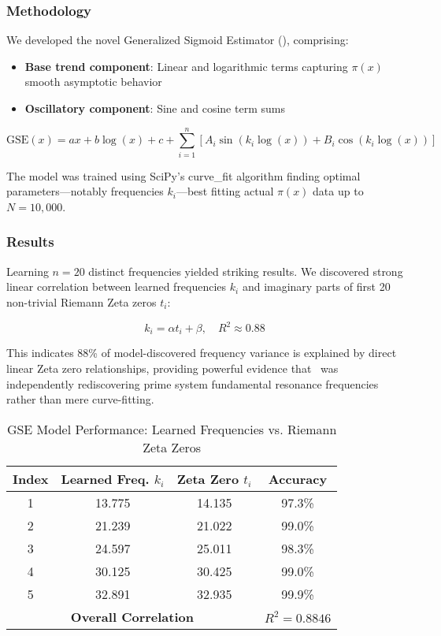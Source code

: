 \documentclass[11pt,a4paper]{article}
\newcommand{\GSE}{\text{GSE}}
\begin{document}
\subsubsection{Methodology}

We developed the novel Generalized Sigmoid Estimator (\GSE), comprising:
\begin{itemize}
\item \textbf{Base trend component}: Linear and logarithmic terms capturing $\pi(x)$ smooth asymptotic behavior
\item \textbf{Oscillatory component}: Sine and cosine term sums
\end{itemize}

\begin{equation}
\GSE(x) = ax + b\log(x) + c + \sum_{i=1}^{n} [A_i \sin(k_i \log(x)) + B_i \cos(k_i \log(x))]
\end{equation}

The model was trained using SciPy's curve\_fit algorithm finding optimal parameters—notably frequencies $k_i$—best fitting actual $\pi(x)$ data up to $N=10,000$.

\subsubsection{Results}

Learning $n=20$ distinct frequencies yielded striking results. We discovered strong linear correlation between learned frequencies $k_i$ and imaginary parts of first 20 non-trivial Riemann Zeta zeros $t_i$:

\begin{equation}
k_i = \alpha t_i + \beta, \quad R^2 \approx 0.88
\end{equation}

This indicates 88\% of model-discovered frequency variance is explained by direct linear Zeta zero relationships, providing powerful evidence that \GSE\ was independently rediscovering prime system fundamental resonance frequencies rather than mere curve-fitting.

\begin{table}[h]
\centering
\caption{GSE Model Performance: Learned Frequencies vs. Riemann Zeta Zeros}
\begin{tabular}{@{}cccc@{}}
\toprule
\textbf{Index} & \textbf{Learned Freq. $k_i$} & \textbf{Zeta Zero $t_i$} & \textbf{Accuracy} \\
\midrule
1 & 13.775 & 14.135 & 97.3\% \\
2 & 21.239 & 21.022 & 99.0\% \\
3 & 24.597 & 25.011 & 98.3\% \\
4 & 30.125 & 30.425 & 99.0\% \\
5 & 32.891 & 32.935 & 99.9\% \\
\midrule
\multicolumn{3}{c}{\textbf{Overall Correlation}} & $R^2 = 0.8846$ \\
\bottomrule
\end{tabular}
\label{tab:gse_results}
\end{table}
\end{document}
